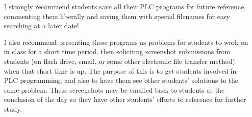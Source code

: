 







I strongly recommend students save all their PLC programs for future reference, commenting them liberally and saving them with special filenames for easy searching at a later date!

\vskip 10pt

I also recommend presenting these programs as problems for students to work on in class for a short time period, then soliciting screenshot submissions from students (on flash drive, email, or some other electronic file transfer method) when that short time is up.  The purpose of this is to get students involved in PLC programming, and also to have them see other students' solutions to the same problem.  These screenshots may be emailed back to students at the conclusion of the day so they have other students' efforts to reference for further study.





